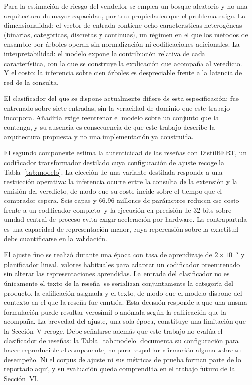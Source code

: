 Para la estimación de riesgo del vendedor se emplea un bosque aleatorio y no una arquitectura
de mayor capacidad, por tres propiedades que el problema exige. La dimensionalidad: el vector
de entrada contiene ocho características heterogéneas (binarias, categóricas, discretas y
continuas), un régimen en el que los métodos de ensamble por árboles operan sin normalización
ni codificaciones adicionales. La interpretabilidad: el modelo expone la contribución relativa
de cada característica, con la que se construye la explicación que acompaña al veredicto. Y el
costo: la inferencia sobre cien árboles es despreciable frente a la latencia de red de la
consulta.

El clasificador del que se dispone actualmente difiere de esta especificación: fue entrenado
sobre siete entradas, sin la veracidad de dominio que este trabajo incorpora. Añadirla exige
reentrenar el modelo sobre un conjunto que la contenga, y su ausencia es consecuencia de que
este trabajo describe la arquitectura propuesta y no una implementación ya construida.

El segundo componente estima la autenticidad de las reseñas con DistilBERT, un codificador
transformador destilado cuya configuración de ajuste recoge la Tabla~\ref{tab:modelo}. La
elección de una variante destilada responde a una restricción operativa: la inferencia ocurre
entre la consulta de la extensión y la emisión del veredicto, de modo que su costo incide
sobre el tiempo que el comprador espera. Seis capas y 66.96 millones de parámetros reducen ese
costo frente a un codificador completo, y la ejecución en precisión de 32 bits sobre unidad
central de proceso evita exigir aceleración por hardware. La contrapartida es una capacidad de
representación menor, cuya repercusión sobre la exactitud debe cuantificarse en la validación.

El ajuste fino se realizó durante una época con tasa de aprendizaje de $2\times10^{-5}$ y
planificador lineal, valores habituales para adaptar un codificador preentrenado sin alterar
las representaciones aprendidas. La entrada del clasificador no es únicamente el texto de la
reseña: se serializan conjuntamente la categoría del producto, la calificación asignada y el
texto, de modo que el modelo dispone del contexto en el que la reseña fue emitida. Esta
decisión responde a que una misma formulación puede resultar verosímil o anómala según la
calificación que la acompaña. La brevedad del ajuste, una sola época, constituye una limitación que la Sección~V recoge.
Debe señalarse además que este trabajo no evalúa el clasificador de reseñas: la
Tabla~\ref{tab:modelo} documenta su configuración para hacer reproducible el componente, no
para respaldar afirmación alguna sobre su desempeño. Ni el corpus de ajuste ni sus métricas de
prueba forman parte de lo reportado aquí, y su evaluación queda comprendida en el trabajo
futuro de la Sección~VI.

